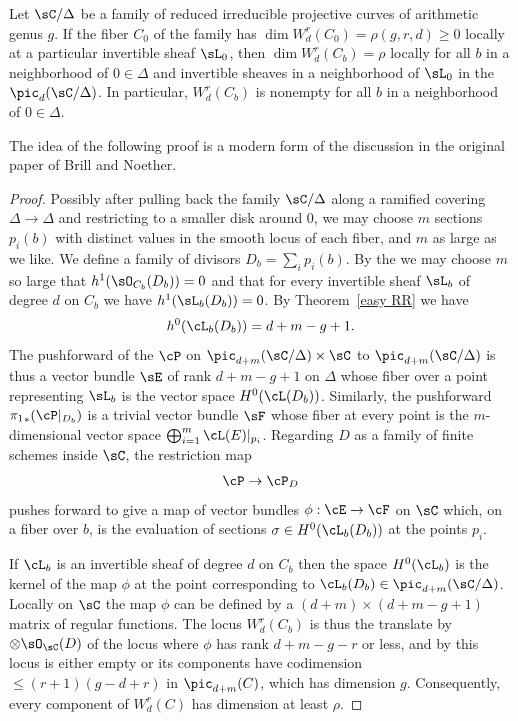 \begin{theorem}\label{local existence}
Let $\sC/\Delta$ be a family of reduced irreducible projective curves
of arithmetic genus $g$. If
the fiber  $C_0$ of the family has $\dim W^r_d(C_0) = \rho(g,r,d) \geq 0$
locally at a particular invertible sheaf $\sL_{0}$,  then $\dim W^r_d(C_b)
= \rho$ locally for all $b$ in a neighborhood of $0 \in \Delta$ and
invertible sheaves in a neighborhood of $\sL_{0}$
in the 
%
$\pic_{d}(\sC/\Delta)$. In particular,
$W^r_d(C_b)$ is nonempty for all $b$ in a neighborhood of $0 \in \Delta$.
\unif
\end{theorem}

The idea of the following proof is a modern form of the discussion in
the original paper of Brill and Noether.

\begin{proof}  Possibly after pulling back the family $\sC/\Delta$
along a ramified covering $\Delta\to \Delta$
and restricting to a smaller disk around 0, we may choose $m$ sections
$p_{i}(b)$ with distinct values in the smooth locus of each fiber,
and $m$ as large as we like. We
define a family of divisors $D_{b} = \sum_{i}p_{i}(b)$.
By the 
%
we may choose $m$ so large
that $h^{1}(\sO_{C_{b}}(D_{b})) = 0$
and that for every invertible sheaf $\sL_{b}$ of degree $d$ on $C_{b}$
we have
$h^{1}(\sL_{b}(D_{b})) = 0$.
By Theorem~\ref{easy RR} we have
$$
h^0(\cL_{b}(D_{b})) =  d+m - g + 1.
$$
The pushforward of the 
%
$\cP$ 
on $\pic_{d+m}(\sC/\Delta)
\times \sC$ to $\pic_{d+m}(\sC/\Delta)$ is thus a vector
bundle $\sE$ of rank $d + m - g + 1$ on $\Delta$ whose fiber over a point
representing $\sL_{b}$ is the vector space $H^0(\cL(D_{b}))$. Similarly,
the pushforward
${\pi_1}_*(\cP|_{D_{b}})$
is a trivial vector bundle $\sF$ whose fiber at every point is the
$m$-dimensional vector space $\bigoplus_{i = 1}^{m} \cL(E)|_{p_i}$. Regarding
$D$ as a family of finite schemes inside $\sC$, the restriction map
$$
\cP  \to \cP_{D}
$$
pushes forward to give a map of vector bundles $\phi : \cE \to \cF$ on
$\sC$ which, on a fiber over $b$, is the evaluation of sections $\sigma
\in H^0(\cL_{b}(D_{b}))$ at the points $p_i$.

If $\cL_{b}$ is an invertible sheaf of degree $d$ on $C_{b}$ then
the space $H^0(\cL_{b})$ is the kernel of the map $\phi$ at the point
corresponding to $\cL_{b}(D_{b}) \in \pic_{d+m}(\sC/\Delta)$. Locally
on $\sC$ the map $\phi$ can be defined by a $(d+m) \times (d+m-g+1)$
matrix of regular functions. The locus $W^r_d(C_{b})$ is
thus the translate
by $\otimes \sO_{\sC}(D)$ of the locus where $\phi$ has rank $d+m-g-r$ or
less, and by \cite[Exercise 10.9]{Eisenbud1995} this locus is either empty
or its components have codimension $\leq (r+1)(g-d+r)$ in $\pic_{d+m}(C)$,
which has dimension $g$. Consequently, every component of $W^r_d(C)$
has dimension at least $\rho$.
\end{proof}

